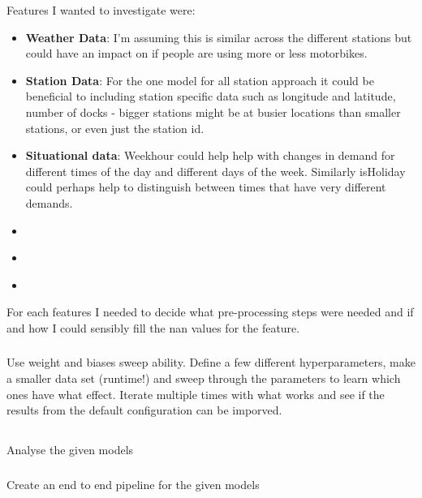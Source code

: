 \documentclass[a4paper]{article}
\begin{document}
    Features I wanted to investigate were:
    \begin{itemize}
        \item \textbf{Weather Data}: I'm assuming this is similar across the different stations but could have an impact on
        if people are using more or less motorbikes.
        \item \textbf{Station Data}: For the one model for all station approach it could be beneficial to including station specific data such as longitude
        and latitude, number of docks - bigger stations might be at busier locations than smaller stations, or even just the station id.
        \item \textbf{Situational data}: Weekhour could help help with changes in demand for different times of the day and different days of the week.
        Similarly isHoliday could perhaps help to distinguish between times that have very different demands.
        \item \textbf{}
        \item \textbf{}
        \item \textbf{}
    \end{itemize}

    For each features I needed to decide what pre-processing steps were needed and if and how I could sensibly fill the nan values
    for the feature.

    \subsubsection*{}
    Use weight and biases sweep ability. Define a few different hyperparameters, make a smaller data set (runtime!) and
    sweep through the parameters to learn which ones have what effect. Iterate multiple times with what works and
    see if the results from the default configuration can be imporved.

    \subsection*{}
    \subsubsection*{} Analyse the given models
    \subsubsection*{} Create an end to end pipeline for the given models
\end{document}
